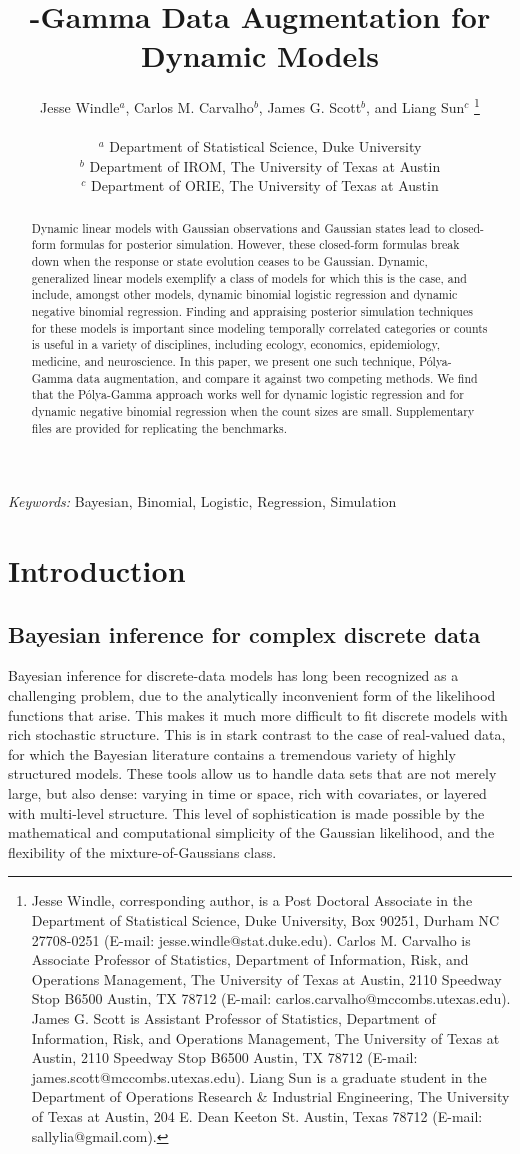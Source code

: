 \documentclass[12pt]{article}
\title{\Polya-Gamma Data Augmentation for Dynamic Models}
\author{ %
  Jesse Windle$^{a}$, %
  Carlos M. Carvalho$^{b}$, %
  James G. Scott$^{b}$, and %
  Liang Sun$^{c}$ %
  \footnote{ %
    Jesse Windle, corresponding author, is a Post Doctoral Associate in the
    Department of Statistical Science, Duke University, Box 90251, Durham NC
    27708-0251 (E-mail: jesse.windle@stat.duke.edu).
    Carlos M. Carvalho is Associate Professor of Statistics, Department of
    Information, Risk, and Operations Management, The University of Texas at Austin,
    2110 Speedway Stop B6500 Austin, TX 78712 (E-mail:
    carlos.carvalho@mccombs.utexas.edu).
    James G. Scott is Assistant Professor of Statistics, Department of Information,
    Risk, and Operations Management, The University of Texas at Austin,
    2110 Speedway Stop B6500 Austin, TX 78712 (E-mail:
    james.scott@mccombs.utexas.edu).
    Liang Sun is a graduate student in the Department of Operations Research \&
    Industrial Engineering, The University of Texas at Austin, 204 E. Dean Keeton
    St.  Austin, Texas 78712 (E-mail: sallylia@gmail.com).
  }
  \\ \\
  $^{a}$ Department of Statistical Science, Duke University \\
  $^{b}$ Department of IROM, The University of Texas at Austin \\
  $^{c}$ Department of ORIE, The University of Texas at Austin %
}
\newcommand{\Polya}{P\'{o}lya}
\begin{document}
\maketitle

\begin{abstract}
Dynamic linear models with Gaussian observations and Gaussian states lead to
closed-form formulas for posterior simulation.  However, these closed-form
formulas break down when the response or state evolution ceases to be Gaussian.
Dynamic, generalized linear models exemplify a class of models for which this is
the case, and include, amongst other models, dynamic binomial logistic
regression and dynamic negative binomial regression.  Finding and appraising
posterior simulation techniques for these models is important since modeling
temporally correlated categories or counts is useful in a variety of
disciplines, including ecology, economics, epidemiology, medicine, and
neuroscience.  In this paper, we present one such technique, \Polya-Gamma data
augmentation, and compare it against two competing methods.  We find that the
\Polya-Gamma approach works well for dynamic logistic regression and for dynamic
negative binomial regression when the count sizes are small.  Supplementary
files are provided for replicating the benchmarks.
\end{abstract}

\noindent %
{\it Keywords:} {Bayesian, Binomial, Logistic, Regression, Simulation}


\doublespace

\section{Introduction}

\subsection{Bayesian inference for complex discrete data}

Bayesian inference for discrete-data models has long been recognized as a
challenging problem, due to the analytically inconvenient form of the likelihood
functions that arise.  This makes it much more difficult to fit discrete models
with rich stochastic structure.  This is in stark contrast to the case of
real-valued data, for which the Bayesian literature contains a tremendous
variety of highly structured models.  These tools allow us to handle data sets
that are not merely large, but also dense: varying in time or space, rich with
covariates, or layered with multi-level structure.  This level of sophistication
is made possible by the mathematical and computational simplicity of the
Gaussian likelihood, and the flexibility of the mixture-of-Gaussians class.
\end{document}
